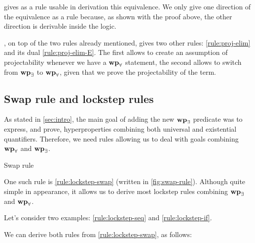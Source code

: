  gives as a rule usable in derivation this equivalence. We only give one direction of the equivalence as a rule because, as shown with the proof above, the other direction is derivable inside the logic.

, on top of the two rules already mentioned, gives two other rules: \cref{rule:proj-elim} and its dual \cref{rule:proj-elim-E}. The first allows to create an assumption of projectability whenever we have a $\mathbf{wp}_{\forall}$ statement, the second allows to switch from $\mathbf{wp}_{\exists}$ to $\mathbf{wp}_{\forall}$, given that we prove the projectability of the term.

\subsection{Swap rule and lockstep rules}

As stated in \cref{sec:intro}, the main goal of adding the new $\mathbf{wp}_{\exists}$ predicate was to express, and prove, hyperproperties combining both universal and existential quantifiers. Therefore, we need rules allowing us to deal with goals combining $\mathbf{wp}_{\forall}$ and $\mathbf{wp}_{\exists}$.

\begin{mathfig}{\small}
    \begin{proofrules}        
        
        \label{rule:lockstep-swap}
    \end{proofrules}
    \caption{Swap rule}
    \label{fig:swap-rule}
\end{mathfig}

One such rule is \cref{rule:lockstep-swap} (written in \cref{fig:swap-rule}). Although quite simple in appearance, it allows us to derive most lockstep rules combining $\mathbf{wp}_{\exists}$ and $\mathbf{wp}_{\forall}$.

Let's consider two examples: \cref{rule:lockstep-seq} and \cref{rule:lockstep-if}.

\resizebox{0.8\width}{!}{
    \begin{proofrules}
        
        \label{rule:lockstep-seq}

        
        \label{rule:lockstep-if}
    \end{proofrules}
    }

    \bigskip

    We can derive both rules from \cref{rule:lockstep-swap}, as follows:

